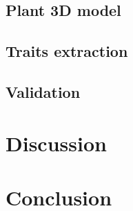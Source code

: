 \subsection{Plant 3D model}


\subsection{Traits extraction}



\subsection{Validation}




\section{Discussion}



\section{Conclusion}